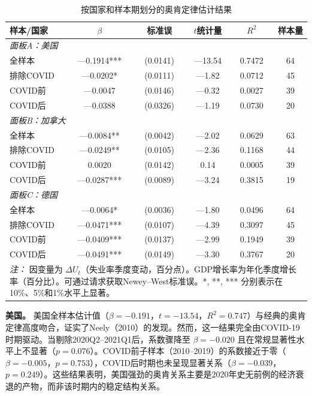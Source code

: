 \documentclass[12pt,a4paper,UTF8]{ctexart}
\begin{document}
\begin{table}[H]
\centering
\caption{按国家和样本期划分的奥肯定律估计结果}
\label{tab:main}
\begin{tabular}{lccccc}
\toprule
\textbf{样本/国家} & $\beta$ & 标准误 & $t$统计量 & $R^2$ & 样本量 \\
\midrule
\multicolumn{6}{l}{\textit{面板A：美国}} \\
\quad 全样本 & ---0.1914*** & (0.0141) & ---13.54 & 0.7472 & 64 \\
\quad 排除COVID & ---0.0202* & (0.0111) & ---1.82 & 0.0712 & 45 \\
\quad COVID前 & ---0.0047 & (0.0146) & ---0.32 & 0.0027 & 39 \\
\quad COVID后 & ---0.0388 & (0.0326) & ---1.19 & 0.0730 & 20 \\
\midrule
\multicolumn{6}{l}{\textit{面板B：加拿大}} \\
\quad 全样本 & ---0.0084** & (0.0042) & ---2.02 & 0.0629 & 63 \\
\quad 排除COVID & ---0.0249** & (0.0105) & ---2.36 & 0.1168 & 44 \\
\quad COVID前 & 0.0020 & (0.0142) & 0.14 & 0.0005 & 39 \\
\quad COVID后 & ---0.0287*** & (0.0089) & ---3.24 & 0.3815 & 19 \\
\midrule
\multicolumn{6}{l}{\textit{面板C：德国}} \\
\quad 全样本 & ---0.0064* & (0.0036) & ---1.80 & 0.0496 & 64 \\
\quad 排除COVID & ---0.0471*** & (0.0107) & ---4.39 & 0.3097 & 45 \\
\quad COVID前 & ---0.0409*** & (0.0137) & ---2.99 & 0.1949 & 39 \\
\quad COVID后 & ---0.0491*** & (0.0149) & ---3.30 & 0.3767 & 20 \\
\bottomrule
\multicolumn{6}{l}{\textit{注：} 因变量为 $\Delta U_t$（失业率季度变动，百分点）。GDP增长率为年化季度增长率（百分比）。可通过请求获取Newey--West标准误。*, **, *** 分别表示在10\%、5\%和1\%水平上显著。}
\end{tabular}
\end{table}

\textbf{美国。} 美国全样本估计值（$\beta = -0.191$，$t = -13.54$，$R^2 = 0.747$）与经典的奥肯定律高度吻合，证实了Neely（2010）的发现。然而，这一结果完全由COVID-19时期驱动。当剔除2020Q2--2021Q1后，系数骤降至 $\beta = -0.020$ 且在常规显著性水平上不显著（$p = 0.076$）。COVID前子样本（2010--2019）的系数接近于零（$\beta = -0.005$，$p = 0.753$），COVID后时期也未呈现显著关系（$\beta = -0.039$，$p = 0.249$）。这些结果表明，美国强劲的奥肯关系主要是2020年史无前例的经济衰退的产物，而非该时期内的稳定结构关系。
\end{document}
